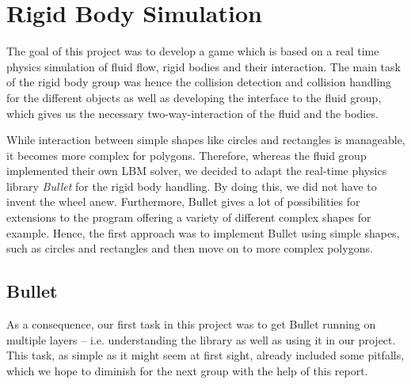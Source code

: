\section{Rigid Body Simulation}

The goal of this project was to develop a game which is based on a real time physics simulation of fluid flow, rigid bodies and their interaction. The main task of the rigid body group was hence the collision detection and collision handling for the different objects as well as developing the interface to the fluid group, which gives us the necessary two-way-interaction of the fluid and the bodies. 

While interaction between simple shapes like circles and rectangles is manageable, it becomes more complex for polygons. Therefore, whereas the fluid group implemented their own LBM solver, we decided to adapt the real-time physics library \emph{Bullet} \cite{Bullet} for the rigid body handling. By doing this, we did not have to invent the wheel anew. Furthermore, Bullet gives a lot of possibilities for extensions to the program offering a variety of different complex shapes for example. Hence, the first approach was to implement Bullet using simple shapes, such as circles and rectangles and then move on to more complex polygons.

\subsection{Bullet}
As a consequence, our first task in this project was to get Bullet running on multiple layers -- i.e. understanding the library as well as using it in our project. This task, as simple as it might seem at first sight, already included some pitfalls, which we hope to diminish for the next group with the help of this report. 
